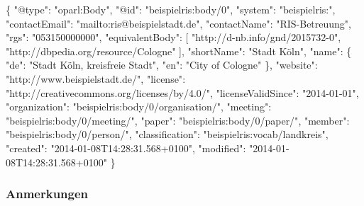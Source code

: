 \documentclass[,a4paper]{article}
\newenvironment{Shaded}{}{}
\newcommand{\DataTypeTok}[1]{\textcolor[rgb]{0.56,0.13,0.00}{{#1}}}
\newcommand{\StringTok}[1]{\textcolor[rgb]{0.25,0.44,0.63}{{#1}}}
\newcommand{\OtherTok}[1]{\textcolor[rgb]{0.00,0.44,0.13}{{#1}}}
\newcommand{\FunctionTok}[1]{\textcolor[rgb]{0.02,0.16,0.49}{{#1}}}
\begin{document}
\begin{Shaded}
\begin{Highlighting}[]
\FunctionTok{\{}
    \DataTypeTok{"@type"}\FunctionTok{:} \StringTok{"oparl:Body"}\FunctionTok{,}
    \DataTypeTok{"@id"}\FunctionTok{:} \StringTok{"beispielris:body/0"}\FunctionTok{,}
    \DataTypeTok{"system"}\FunctionTok{:} \StringTok{"beispielris:"}\FunctionTok{,}
    \DataTypeTok{"contactEmail"}\FunctionTok{:} \StringTok{"mailto:ris@beispielstadt.de"}\FunctionTok{,}
    \DataTypeTok{"contactName"}\FunctionTok{:} \StringTok{"RIS-Betreuung"}\FunctionTok{,}
    \DataTypeTok{"rgs"}\FunctionTok{:} \StringTok{"053150000000"}\FunctionTok{,}
    \DataTypeTok{"equivalentBody"}\FunctionTok{:} \OtherTok{[}
        \StringTok{"http://d-nb.info/gnd/2015732-0"}\OtherTok{,}
        \StringTok{"http://dbpedia.org/resource/Cologne"}
    \OtherTok{]}\FunctionTok{,}
    \DataTypeTok{"shortName"}\FunctionTok{:} \StringTok{"Stadt Köln"}\FunctionTok{,}
    \DataTypeTok{"name"}\FunctionTok{:} \FunctionTok{\{}
        \DataTypeTok{"de"}\FunctionTok{:} \StringTok{"Stadt Köln, kreisfreie Stadt"}\FunctionTok{,}
        \DataTypeTok{"en"}\FunctionTok{:} \StringTok{"City of Cologne"}
    \FunctionTok{\},}
    \DataTypeTok{"website"}\FunctionTok{:} \StringTok{"http://www.beispielstadt.de/"}\FunctionTok{,}
    \DataTypeTok{"license"}\FunctionTok{:} \StringTok{"http://creativecommons.org/licenses/by/4.0/"}\FunctionTok{,}
    \DataTypeTok{"licenseValidSince"}\FunctionTok{:} \StringTok{"2014-01-01"}\FunctionTok{,}
    \DataTypeTok{"organization"}\FunctionTok{:} \StringTok{"beispielris:body/0/organisation/"}\FunctionTok{,}
    \DataTypeTok{"meeting"}\FunctionTok{:} \StringTok{"beispielris:body/0/meeting/"}\FunctionTok{,}
    \DataTypeTok{"paper"}\FunctionTok{:} \StringTok{"beispielris:body/0/paper/"}\FunctionTok{,}
    \DataTypeTok{"member"}\FunctionTok{:} \StringTok{"beispielris:body/0/person/"}\FunctionTok{,}
    \DataTypeTok{"classification"}\FunctionTok{:} \StringTok{"beispielris:vocab/landkreis"}\FunctionTok{,}
    \DataTypeTok{"created"}\FunctionTok{:} \StringTok{"2014-01-08T14:28:31.568+0100"}\FunctionTok{,}
    \DataTypeTok{"modified"}\FunctionTok{:} \StringTok{"2014-01-08T14:28:31.568+0100"}
\FunctionTok{\}}
\end{Highlighting}
\end{Shaded}

\subsubsection{Anmerkungen}\label{anmerkungen-1}
\end{document}
